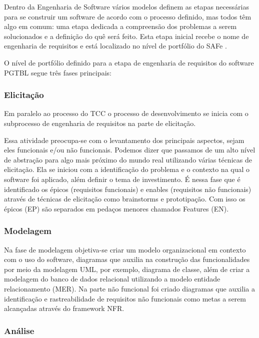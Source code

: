 Dentro da Engenharia de Software vários modelos definem as etapas necessárias para se construir um software de acordo com o processo definido, mas todos têm algo em comum: uma etapa dedicada a compreensão dos problemas a serem solucionados e a definição do quê será feito. Esta etapa inicial recebe o nome de engenharia de requisitos e está localizado no nível de portfólio do SAFe \cite{pressman}.

O nível de portfólio definido para a etapa de engenharia de requisitos do software PGTBL segue três
fases principais:

\subsubsection{Elicitação}

Em paralelo ao processo do TCC o processo de desenvolvimento se inicia com o subprocesso de engenharia de requisitos na
parte de elicitação.

Essa atividade preocupa-se com o levantamento dos principais aspectos, sejam eles funcionais e/ou não funcionais.
Podemos dizer que passamos de um alto nível de abstração para algo mais próximo do mundo real utilizando várias técnicas
de elicitação. Ela se iniciou com a identificação do problema e o contexto na qual o software foi aplicado, além definir
o tema de investimento. É nessa fase que é identificado os épicos (requisitos funcionais) e enables (requisitos não
funcionais) através de técnicas de elicitação como brainstorms e prototipação. Com isso os épicos (EP) são separados em
pedaços menores chamados Features (EN).

\subsubsection{Modelagem}

Na fase de modelagem objetiva-se criar um modelo organizacional em contexto com o uso do software, diagramas que auxilia
na construção das funcionalidades por meio da modelagem UML, por exemplo, diagrama de classe, além de criar a modelagem
do banco de dados relacional utilizando a modelo entidade relacionamento (MER). Na parte não funcional foi criado
diagramas que auxilia a identificação e rastreabilidade de requisitos não funcionais como metas a serem alcançadas
através do framework NFR.

\subsubsection{Análise}

